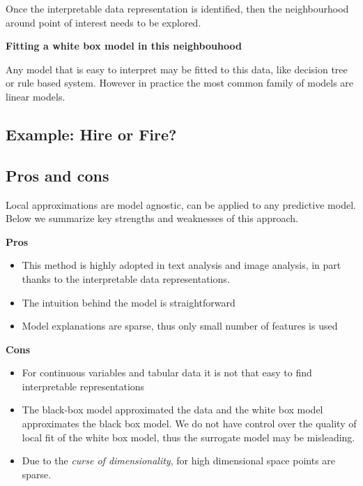 \documentclass[]{krantz}
\providecommand{\tightlist}{%
  \setlength{\itemsep}{0pt}\setlength{\parskip}{0pt}}
\theoremstyle{definition}
\theoremstyle{definition}
\theoremstyle{definition}
\theoremstyle{remark}
\begin{document}
Once the interpretable data representation is identified, then the
neighbourhood around point of interest needs to be explored.

\textbf{Fitting a white box model in this neighbouhood}

Any model that is easy to interpret may be fitted to this data, like
decision tree or rule based system. However in practice the most common
family of models are linear models.

\hypertarget{example-hire-or-fire-3}{%
\subsection{Example: Hire or Fire?}\label{example-hire-or-fire-3}}

\hypertarget{pros-and-cons-4}{%
\subsection{Pros and cons}\label{pros-and-cons-4}}

Local approximations are model agnostic, can be applied to any
predictive model. Below we summarize key strengths and weaknesses of
this approach.

\textbf{Pros}

\begin{itemize}
\tightlist
\item
  This method is highly adopted in text analysis and image analysis, in
  part thanks to the interpretable data representations.
\item
  The intuition behind the model is straightforward
\item
  Model explanations are sparse, thus only small number of features is
  used
\end{itemize}

\textbf{Cons}

\begin{itemize}
\tightlist
\item
  For continuous variables and tabular data it is not that easy to find
  interpretable representations
\item
  The black-box model approximated the data and the white box model
  approximates the black box model. We do not have control over the
  quality of local fit of the white box model, thus the surrogate model
  may be misleading.
\item
  Due to the \emph{curse of dimensionality}, for high dimensional space
  points are sparse.
\end{itemize}
\end{document}
